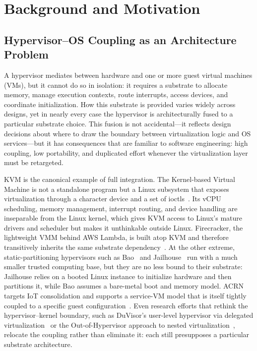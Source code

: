 \section{Background and Motivation}

\subsection{Hypervisor--OS Coupling as an Architecture Problem}

A hypervisor mediates between hardware and one or more guest virtual machines
(VMs), but it cannot do so in isolation: it requires a substrate to allocate
memory, manage execution contexts, route interrupts, access devices, and
coordinate initialization. How this substrate is provided varies widely across
designs, yet in nearly every case the hypervisor is architecturally fused to a
particular substrate choice. This fusion is not accidental---it reflects design
decisions about where to draw the boundary between virtualization logic and OS
services---but it has consequences that are familiar to software engineering:
high coupling, low portability, and duplicated effort whenever the
virtualization layer must be retargeted.

KVM is the canonical example of full integration. The Kernel-based Virtual
Machine is not a standalone program but a Linux subsystem that exposes
virtualization through a  character device and a set of
ioctls~\cite{kivity2007kvm}. Its vCPU scheduling, memory management, interrupt
routing, and device handling are inseparable from the Linux kernel, which gives
KVM access to Linux's mature drivers and scheduler but makes it unthinkable
outside Linux. Firecracker, the lightweight VMM behind AWS Lambda, is built atop
KVM and therefore transitively inherits the same substrate
dependency~\cite{agache2020firecracker}. At the other extreme,
static-partitioning hypervisors such as Bao~\cite{martins2020bao} and
Jailhouse~\cite{ramsauer2017jailhouse} run with a much smaller trusted computing
base, but they are no less bound to their substrate: Jailhouse relies on a
booted Linux instance to initialize hardware and then partitions it, while Bao
assumes a bare-metal boot and memory model. ACRN targets IoT consolidation and
supports a service-VM model that is itself tightly coupled to a specific guest
configuration~\cite{li2019acrn}. Even research efforts that rethink the
hypervisor--kernel boundary, such as DuVisor's user-level hypervisor via
delegated virtualization~\cite{chen2022duvisor} or the Out-of-Hypervisor
approach to nested virtualization~\cite{bitchebe2022ooh}, relocate the coupling
rather than eliminate it: each still presupposes a particular substrate
architecture.

